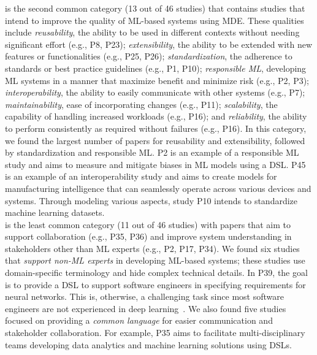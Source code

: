 is the second common category (13 out of 46 studies) that contains studies that intend to improve the quality of ML-based systems using MDE. These qualities include \textit{reusability}, the ability to be used in different contexts without needing significant effort  (e.g., P8, P23); \textit{extensibility}, the ability to be extended with new features or functionalities (e.g., P25, P26); \textit{standardization}, the adherence to standards or best practice guidelines (e.g., P1, P10); \textit{responsible ML}, developing ML systems in a manner that maximize benefit and minimize risk  (e.g., P2, P3); \textit{interoperability}, the ability to easily communicate with other systems (e.g., P7);  \textit{maintainability}, ease of incorporating changes (e.g., P11); \textit{scalability}, the capability of handling increased workloads  (e.g., P16); and \textit{reliability}, the ability to perform consistently as required without failures (e.g., P16). In this category, we found the largest number of papers for reusability and extensibility, followed by standardization and responsible ML. P2 is an example of a responsible ML study and aims to measure and mitigate biases in ML models using a DSL. P45 is an example of an interoperability study and aims to create models for manufacturing intelligence that can seamlessly operate across various devices and systems. Through modeling various aspects, study P10 intends to standardize machine learning datasets. \\

is the least common category (11 out of 46 studies) with papers that aim to support collaboration (e.g., P35, P36) and improve system understanding in stakeholders other than ML experts (e.g., P2, P17, P34). We found six studies that \textit{support non-ML experts} in developing ML-based systems; these studies use domain-specific terminology and hide complex technical details. In P39, the goal is to provide a DSL to support software engineers in specifying requirements for neural networks. This is, otherwise, a challenging task since most software engineers are not experienced in deep learning~\cite{ahmad2023requirements}. We also found five studies focused on providing a \textit{common language} for easier communication and stakeholder collaboration. For example, P35 aims to facilitate multi-disciplinary teams developing data analytics and machine learning solutions using DSLs.  \\

